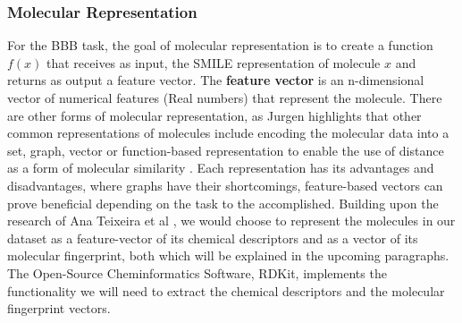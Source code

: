 \documentclass[a4paper,12pt]{report}
\begin{document}
			\subsubsection{Molecular Representation}
			For the BBB task, the goal of molecular representation is to create a function $f(x)$ that receives as input, the SMILE representation of molecule $x$ and returns as output a feature vector. The \textbf{feature vector} is an n-dimensional vector of numerical features (Real numbers) that represent the molecule. 
			There are other forms of molecular representation, as Jurgen \cite{Jurgen2004} highlights that other common representations of molecules include encoding the molecular data into a set, graph, vector or function-based representation to enable the use of distance as a form of molecular similarity \cite{Jurgen2004}. Each representation has its advantages and disadvantages, where graphs have their shortcomings, feature-based vectors can prove beneficial depending on the task to the accomplished. Building upon the research of Ana Teixeira et al \cite{Anaetal2012}, we would choose to represent the molecules in our dataset as a feature-vector of its chemical descriptors and as a vector of its molecular fingerprint, both which will be explained in the upcoming paragraphs. The Open-Source Cheminformatics Software, RDKit, implements the functionality we will need to extract the chemical descriptors and the molecular fingerprint vectors.
\end{document}
